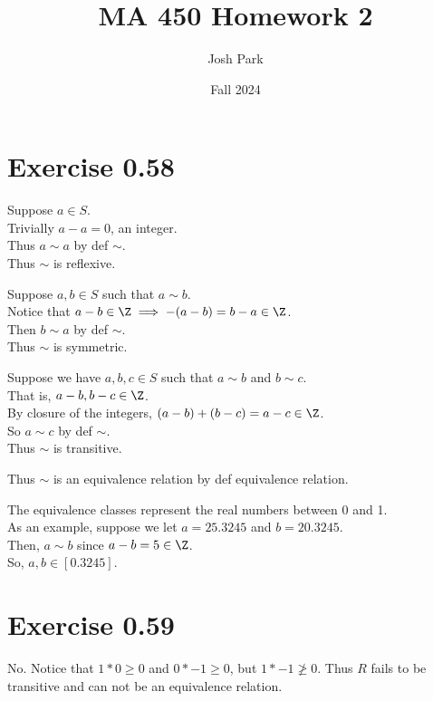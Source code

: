 \documentclass{article}
\author{Josh Park}
\date{\vspace*{-1em}Fall 2024}
\title{\vspace*{-2em}MA 450 Homework 2\vspace*{-1em}}
\begin{document}
\maketitle
\section*{Exercise 0.58}
Suppose \(a\in S\). \\
Trivially \(a-a=0\), an integer. \\
Thus \(a\sim a\) by def \(\sim\). \\
Thus \(\sim\) is reflexive.

Suppose \(a,b\in S\) such that \(a\sim b\). \\
Notice that \(a-b\in\Z \implies -(a-b)=b-a\in\Z\). \\
Then \(b\sim a\) by def \(\sim\).\\
Thus \(\sim\) is symmetric.

Suppose we have \(a, b, c\in S\) such that \(a\sim b\) and \(b\sim c\). \\
That is, \(a-b, b-c\in\Z\). \\
By closure of the integers, \((a-b)+(b-c)=a-c\in\Z\). \\
So \(a\sim c\) by def \(\sim\). \\
Thus \(\sim\) is transitive.

Thus \(\sim\) is an equivalence relation by def equivalence relation.

The equivalence classes represent the real numbers between 0 and 1. \\
As an example, suppose we let \(a=25.3245\) and \(b=20.3245\). \\
Then, \(a\sim b\) since \(a-b=5\in \Z\). \\
So, \(a,b\in [0.3245]\). \\

\section*{Exercise 0.59}
No. Notice that \(1*0\geq 0\) and \(0*-1\geq 0\), but \(1*-1\not\geq 0\). Thus \(R\) fails to be transitive and can not be an equivalence relation.
\end{document}
